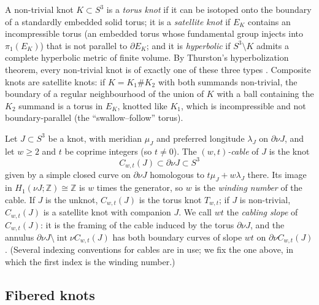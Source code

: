 \documentclass[11pt]{article}
\newcommand{\Z}{\mathbb Z}
\newcommand{\Int}{\operatorname{int}}
\newcommand{\nbd}{\nu}
\theoremstyle{definition}
\theoremstyle{remark}
\begin{document}
A non-trivial knot \(K\subset S^3\) is a \emph{torus knot} if it can be
isotoped onto the boundary of a standardly embedded solid torus; it is a
\emph{satellite knot} if \(E_K\) contains an incompressible torus (an
embedded torus whose fundamental group injects into \(\pi_1(E_K)\)) that
is not parallel to \(\partial E_K\); and it is \emph{hyperbolic} if
\(S^3\setminus K\) admits a complete hyperbolic metric of finite volume.
By Thurston's hyperbolization theorem, every non-trivial knot is of
exactly one of these three types \cite[Corollary~2.5]{Thurston1982}.
Composite knots are satellite knots: if \(K=K_1\#K_2\) with both
summands non-trivial, the boundary of a regular neighbourhood of the
union of \(K\) with a ball containing the \(K_2\) summand is a torus in
\(E_K\), knotted like \(K_1\), which is incompressible and not
boundary-parallel (the ``swallow--follow'' torus).

Let \(J\subset S^3\) be a knot, with meridian \(\mu_J\) and preferred
longitude \(\lambda_J\) on \(\partial\nbd J\), and let \(w\geq2\) and
\(t\) be coprime integers (so \(t\neq0\)). The \emph{\((w,t)\)-cable} of
\(J\) is the knot
\[
 C_{w,t}(J)\subset\partial\nbd J\subset S^3
\]
given by a simple closed curve on \(\partial\nbd J\) homologous to
\(t\mu_J+w\lambda_J\) there. Its image in \(H_1(\nbd J;\Z)\cong\Z\) is
\(w\) times the generator, so \(w\) is the \emph{winding number} of the
cable. If \(J\) is the unknot, \(C_{w,t}(J)\) is the torus knot
\(T_{w,t}\); if \(J\) is non-trivial, \(C_{w,t}(J)\) is a satellite knot
with companion \(J\). We call \(wt\) the \emph{cabling slope} of
\(C_{w,t}(J)\): it is the framing of the cable induced by the torus
\(\partial\nbd J\), and the annulus
\(\partial\nbd J\setminus\Int\nbd C_{w,t}(J)\) has both boundary curves of
slope \(wt\) on \(\partial\nbd C_{w,t}(J)\). (Several indexing
conventions for cables are in use; we fix the one above, in which the
first index is the winding number.)

\subsection{Fibered knots}\label{sec:fibered}
\end{document}
